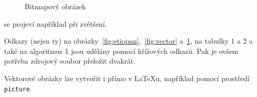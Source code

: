 \documentclass[11pt,a4paper]{article}
\begin{document}
\begin{figure}[h]
    \centering
    \caption{Bitmapový obrázek}
    \label{fig:raster}
\end{figure}
\bigskip

\noindent se projeví například při zvětšení.

Odkazy (nejen ty) na obrázky~\ref{fig:etiopan},~\ref{fig:vector} a~\ref{fig:raster}, na  
tabulky 1 a 2 a také na algoritmus 1 jsou udělány pomocí 
křížových odkazů. Pak je ovšem potřeba zdrojový soubor přeložit dvakrát.

Vektorové obrázky lze vytvořit i přímo v \LaTeX u, například pomocí prostředí\texttt{ picture}.

\newpage
\end{document}

